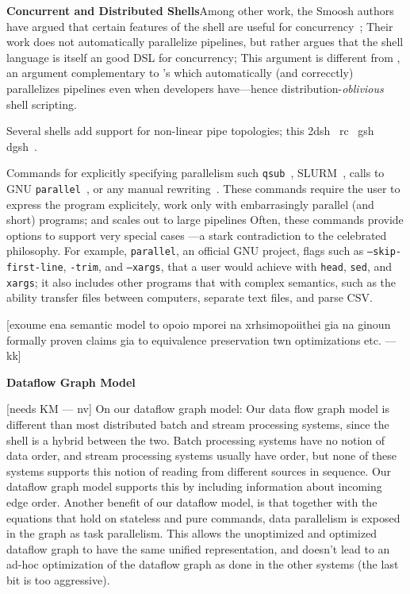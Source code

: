 \documentclass[sigplan,10pt,review,anonymous]{acmart}
\newcommand{\heading}[1]{\vspace{4pt}\noindent\textbf{#1}\enspace}
\newcommand{\ttt}[1]{\texttt{\small #1}}
\newcommand{\tti}[1]{\texttt{\scriptsize #1}}
\newcommand{\nv}[1]{[{\color{cyan}#1 --- nv}]}
\newcommand{\kk}[1]{[{\color{magenta}#1 --- kk}]}
\begin{document}
\heading{Concurrent and Distributed Shells}
\nv{NV}
Among other work, the Smoosh authors have argued that certain features of the shell are useful for concurrency~\cite{smoosh:18};
Their work does not automatically parallelize pipelines, but rather argues that the shell language is itself an good DSL for concurrency;
This argument is different from \sys, 
an argument complementary to \sys's which automatically (and correcctly) parallelizes pipelines even when developers have---hence distribution-\emph{oblivious} shell scripting.

Several shells add support for non-linear pipe topologies;
  this 
2dsh~\cite{}
rc~\cite{}
gsh~\cite{}
dgsh~\cite{dagsh:17}.

Commands for explicitly specifying parallelism such \ttt{qsub}~\cite{gentzsch2001sun}, \textsc{SLURM}~\cite{yoo2003slurm}, calls to \textsc{GNU} \ttt{parallel}~\cite{Tange2011a}, or any manual rewriting~\cite{mapreduce:08, ciel:11, spark:12}.
These commands require the user to express the program explicitely, work only with embarrasingly parallel (and short) programs;
  \sys and scales out to large pipelines
Often, these commands provide options to support very special cases
---a stark contradiction to the celebrated \unix philosophy.
For example, \tti{parallel}, an official GNU project, flags such as \ttt{--skip-first-line}, \ttt{-trim}, and \ttt{--xargs}, that a \unix user would achieve with \ttt{head}, \ttt{sed}, and \ttt{xargs}; it also includes other programs that 
with complex semantics, such as the ability transfer files between computers, separate text files, and parse CSV.

\kk{exoume ena semantic model to opoio mporei na xrhsimopoiithei gia
  na ginoun formally proven claims gia to equivalence preservation twn
  optimizations etc.}

\heading{Dataflow Graph Model}

\nv{needs KM}
On our dataflow graph model: Our data flow graph model is
  different than most distributed batch and stream processing systems,
  since the shell is a hybrid between the two. Batch processing
  systems have no notion of data order, and stream processing systems
  usually have order, but none of these systems supports this notion
  of reading from different sources in sequence. Our dataflow graph
  model supports this by including information about incoming edge
  order. Another benefit of our dataflow model, is that together with
  the equations that hold on stateless and pure commands, data
  parallelism is exposed in the graph as task parallelism. This allows
  the unoptimized and optimized dataflow graph to have the same
  unified representation, and doesn't lead to an ad-hoc optimization
  of the dataflow graph as done in the other systems (the last bit is
  too aggressive).
\end{document}
